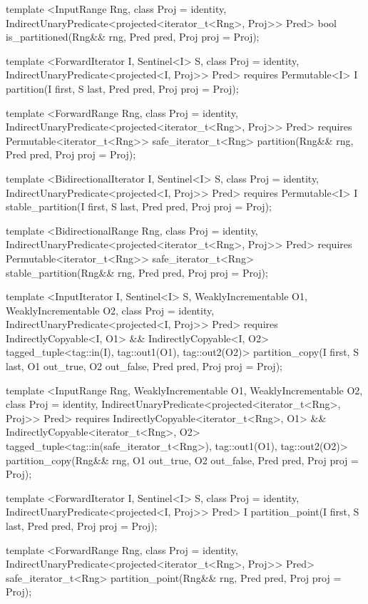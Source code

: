 \begin{codeblock}
{{{{  template <InputRange Rng, class Proj = identity,
      IndirectUnaryPredicate<projected<iterator_t<Rng>, Proj>> Pred>
    bool
      is_partitioned(Rng&& rng, Pred pred, Proj proj = Proj{});

  template <ForwardIterator I, Sentinel<I> S, class Proj = identity,
      IndirectUnaryPredicate<projected<I, Proj>> Pred>
    requires Permutable<I>
    I partition(I first, S last, Pred pred, Proj proj = Proj{});

  template <ForwardRange Rng, class Proj = identity,
      IndirectUnaryPredicate<projected<iterator_t<Rng>, Proj>> Pred>
    requires Permutable<iterator_t<Rng>>
    safe_iterator_t<Rng>
      partition(Rng&& rng, Pred pred, Proj proj = Proj{});

  template <BidirectionalIterator I, Sentinel<I> S, class Proj = identity,
      IndirectUnaryPredicate<projected<I, Proj>> Pred>
    requires Permutable<I>
    I stable_partition(I first, S last, Pred pred, Proj proj = Proj{});

  template <BidirectionalRange Rng, class Proj = identity,
      IndirectUnaryPredicate<projected<iterator_t<Rng>, Proj>> Pred>
    requires Permutable<iterator_t<Rng>>
    safe_iterator_t<Rng>
      stable_partition(Rng&& rng, Pred pred, Proj proj = Proj{});

  template <InputIterator I, Sentinel<I> S, WeaklyIncrementable O1, WeaklyIncrementable O2,
      class Proj = identity, IndirectUnaryPredicate<projected<I, Proj>> Pred>
    requires IndirectlyCopyable<I, O1> && IndirectlyCopyable<I, O2>
    tagged_tuple<tag::in(I), tag::out1(O1), tag::out2(O2)>
      partition_copy(I first, S last, O1 out_true, O2 out_false, Pred pred,
                     Proj proj = Proj{});

  template <InputRange Rng, WeaklyIncrementable O1, WeaklyIncrementable O2,
      class Proj = identity,
      IndirectUnaryPredicate<projected<iterator_t<Rng>, Proj>> Pred>
    requires IndirectlyCopyable<iterator_t<Rng>, O1> &&
      IndirectlyCopyable<iterator_t<Rng>, O2>
    tagged_tuple<tag::in(safe_iterator_t<Rng>), tag::out1(O1), tag::out2(O2)>
      partition_copy(Rng&& rng, O1 out_true, O2 out_false, Pred pred, Proj proj = Proj{});

  template <ForwardIterator I, Sentinel<I> S, class Proj = identity,
      IndirectUnaryPredicate<projected<I, Proj>> Pred>
    I partition_point(I first, S last, Pred pred, Proj proj = Proj{});

  template <ForwardRange Rng, class Proj = identity,
      IndirectUnaryPredicate<projected<iterator_t<Rng>, Proj>> Pred>
    safe_iterator_t<Rng>
      partition_point(Rng&& rng, Pred pred, Proj proj = Proj{});

}}}}
\end{codeblock}
